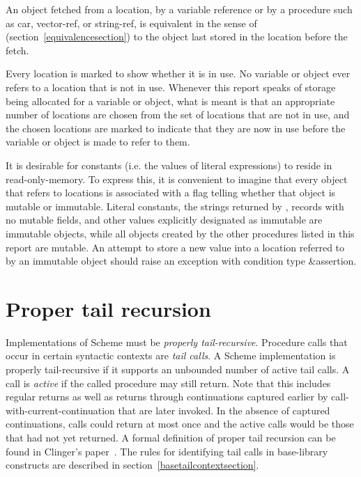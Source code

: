 An object fetched from a location, by a variable reference or by
a procedure such as {\cf car}, {\cf vector-ref}, or {\cf string-ref}, is
equivalent in the sense of  %
(section~\ref{equivalencesection})
to the object last stored in the location before the fetch.

Every location is marked to show whether it is in use.
No variable or object ever refers to a location that is not in use.
Whenever this report speaks of storage being allocated for a variable
or object, what is meant is that an appropriate number of locations are
chosen from the set of locations that are not in use, and the chosen
locations are marked to indicate that they are now in use before the variable
or object is made to refer to them.

It is desirable for constants (i.e. the values of
literal expressions) to reside in read-only-memory.  To express this,
it is convenient to imagine that every object that refers to locations
is associated with a flag telling whether that object is
mutable or immutable.  Literal
constants, the strings returned by , records with
no mutable fields, and other values explicitly designated as immutable
are immutable objects, while all objects created by the other
procedures listed in this report are mutable.  An attempt to store a
new value into a location referred to by an immutable object
should raise an exception with condition type {\cf\&assertion}.


\section{Proper tail recursion}
\label{proper tail recursion}

Implementations of Scheme must be
{\em properly tail-recursive}.
Procedure calls that occur in certain syntactic
contexts are \textit{tail calls}.  A Scheme implementation is
properly tail-recursive if it supports an unbounded number of active
tail calls.  A call is {\em active} if the called procedure may still
return.  Note that this includes regular returns as well as returns
through continuations captured earlier by
{\cf call-with-current-continuation} that are later invoked.
In the absence of captured continuations, calls could
return at most once and the active calls would be those that had not
yet returned.
A formal definition of proper tail recursion can be found
in Clinger's paper~\cite{propertailrecursion}.  The rules for identifying tail calls
in base-library constructs are described in
section~\ref{basetailcontextsection}.

